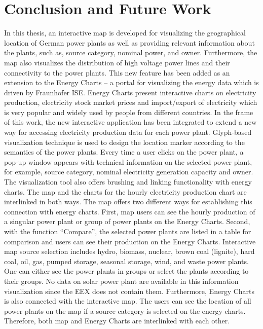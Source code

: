 \chapter{Conclusion and Future Work}
\label{chap:conclusion}

In this thesis, an interactive map is developed for visualizing the geographical location of German power plants as well as providing relevant information about the plants, such as, source category, nominal power, and owner. Furthermore, the map also visualizes the distribution of high voltage power lines and their connectivity to the power plants. This new feature has been added as an extension to the Energy Charts – a portal for visualizing the energy data which is driven by Fraunhofer ISE. Energy Charts present interactive charts on electricity production, electricity stock market prices and import/export of electricity which is very popular and widely used by people from different countries. In the frame of this work, the new interactive application has been integrated to extend a new way for accessing electricity production data for each power plant. Glyph-based visualization technique is used to design the location marker according to the semantics of the power plants. Every time a user clicks on the power plant, a pop-up window appears with technical information on the selected power plant, for example, source category, nominal electricity generation capacity and owner. The visualization tool also offers brushing and linking functionality with energy charts. The map and the charts for the hourly electricity production chart are interlinked in both ways. The map offers two different ways for establishing this connection with energy charts. First, map users can see the hourly production of a singular power plant or group of power plants on the Energy Charts. Second, with the function “Compare”, the selected power plants are listed in a table for comparison and users can see their production on the Energy Charts. Interactive map source selection includes hydro, biomass, nuclear, brown coal (lignite), hard coal, oil, gas, pumped storage, seasonal storage, wind, and waste power plants. One can either see the power plants in groups or select the plants according to their groups. No data on solar power plant are available in this information visualization since the EEX does not contain them. Furthermore, Energy Charts is also connected with the interactive map. The users can see the location of all power plants on the map if a source category is selected on the energy charts. Therefore, both map and Energy Charts are interlinked with each other.  

